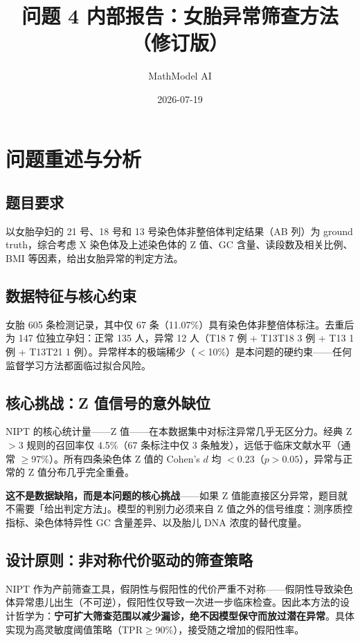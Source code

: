 \documentclass{internal-report}
\title{问题 4 内部报告：女胎异常筛查方法（修订版）}
\author{MathModel AI}
\date{2026-07-19}
\begin{document}
\maketitle

\section{问题重述与分析}

\subsection{题目要求}

以女胎孕妇的 21 号、18 号和 13 号染色体非整倍体判定结果（AB 列）为 ground truth，综合考虑 X 染色体及上述染色体的 Z 值、GC 含量、读段数及相关比例、BMI 等因素，给出女胎异常的判定方法。

\subsection{数据特征与核心约束}

女胎 605 条检测记录，其中仅 67 条（11.07\%）具有染色体非整倍体标注。去重后为 147 位独立孕妇：正常 135 人，异常 12 人（T18 7 例 + T13T18 3 例 + T13 1 例 + T13T21 1 例）。异常样本的极端稀少（$<$10\%）是本问题的硬约束——任何监督学习方法都面临过拟合风险。

\subsection{核心挑战：Z 值信号的意外缺位}

NIPT 的核心统计量——Z 值——在本数据集中对标注异常几乎无区分力。经典 Z$>3$ 规则的召回率仅 4.5\%（67 条标注中仅 3 条触发），远低于临床文献水平（通常 $\geq$97\%）。所有四条染色体 Z 值的 Cohen's $d$ 均 $<0.23$（$p>0.05$），异常与正常的 Z 值分布几乎完全重叠。

\textbf{这不是数据缺陷，而是本问题的核心挑战}——如果 Z 值能直接区分异常，题目就不需要「给出判定方法」。模型的判别力必须来自 Z 值之外的信号维度：测序质控指标、染色体特异性 GC 含量差异、以及胎儿 DNA 浓度的替代度量。

\subsection{设计原则：非对称代价驱动的筛查策略}

NIPT 作为产前筛查工具，假阴性与假阳性的代价严重不对称——假阴性导致染色体异常患儿出生（不可逆），假阳性仅导致一次进一步临床检查。因此本方法的设计哲学为：\textbf{宁可扩大筛查范围以减少漏诊，绝不因模型保守而放过潜在异常}。具体实现为高灵敏度阈值策略（TPR$\geq$90\%），接受随之增加的假阳性率。
\end{document}
